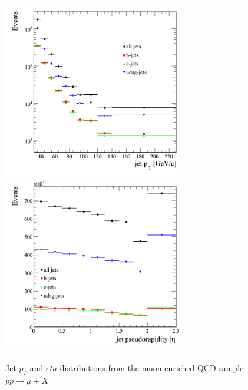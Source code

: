 \begin{figure}[htbp]
  \begin{center}
    \includegraphics[width=80mm]{Figures/jet_pt_muX.png}
    \includegraphics[width=80mm]{Figures/jet_eta_muX.png}
  \end{center}
  \caption{Jet $p_T$ and $eta$ distributions from the muon enriched QCD sample $pp\rightarrow \mu +X$}
  \label{fig:jet_pt_muX}
\end{figure}

